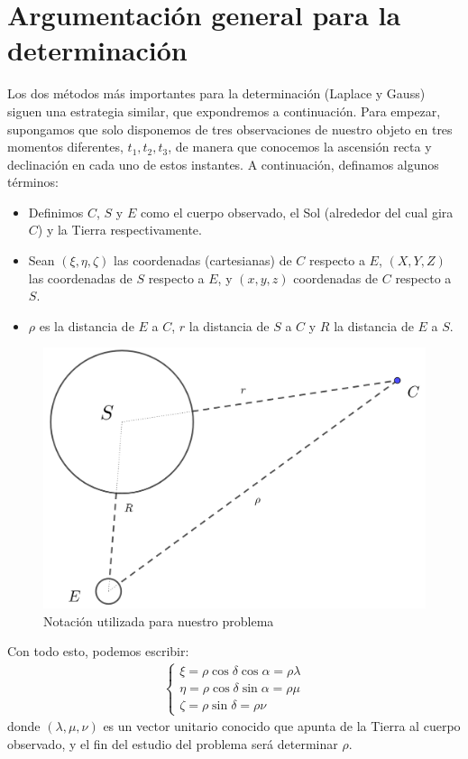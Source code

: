 \section{Argumentación general para la determinación}
Los dos métodos más importantes para la determinación (Laplace y Gauss) siguen una estrategia similar, que expondremos a continuación. Para empezar, supongamos que solo disponemos de tres observaciones de nuestro objeto en tres momentos diferentes, $t_1, t_2, t_3$, de manera que conocemos la ascensión recta y declinación en cada uno de estos instantes. A continuación, definamos algunos términos:
\begin{itemize}
\item Definimos $C$, $S$ y $E$ como el cuerpo observado, el Sol (alrededor del cual gira $C$) y la Tierra respectivamente.
\item Sean $(\xi,\eta,\zeta)$ las coordenadas (cartesianas) de $C$ respecto a $E$, $(X,Y,Z)$ las coordenadas de $S$ respecto a $E$, y $(x,y,z)$ coordenadas de $C$ respecto a $S$.
\item $\rho$ es la distancia de $E$ a $C$, $r$ la distancia de $S$ a $C$ y $R$ la distancia de $E$ a $S$.
\end{itemize}

\begin{figure}[H]
\centering
\includegraphics[scale=0.15]{images/notation.png}
\caption{Notación utilizada para nuestro problema}
\label{fig:notation}
\end{figure}

Con todo esto, podemos escribir:
\begin{align}
\left\{
\begin{array}{l}
\xi = \rho \cos{\delta}\cos{\alpha} = \rho\lambda\\
\eta = \rho \cos{\delta}\sin{\alpha} = \rho\mu\\
\zeta = \rho \sin{\delta} = \rho\nu
\end{array}
\right.
\label{eq:terminologia}
\end{align}
\noindent donde $(\lambda,\mu,\nu)$ es un vector unitario conocido que apunta de la Tierra al cuerpo observado, y el fin del estudio del problema será determinar $\rho$.\\

